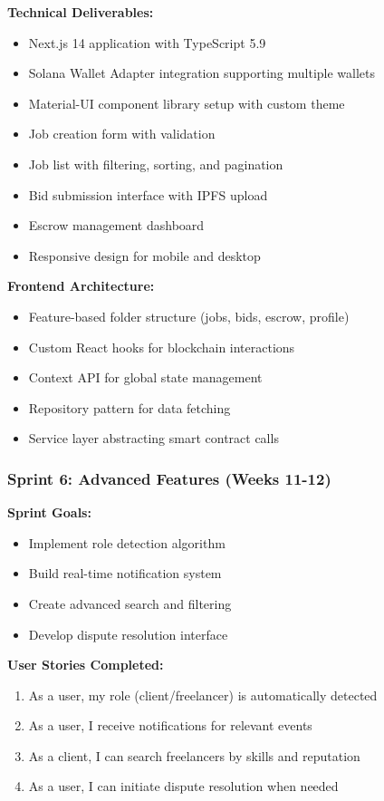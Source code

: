 \documentclass[a4paper,13pt,twoside]{report}
\theoremstyle{definition}
\begin{document}
\textbf{Technical Deliverables:}
\begin{itemize}
    \item Next.js 14 application with TypeScript 5.9
    \item Solana Wallet Adapter integration supporting multiple wallets
    \item Material-UI component library setup with custom theme
    \item Job creation form with validation
    \item Job list with filtering, sorting, and pagination
    \item Bid submission interface with IPFS upload
    \item Escrow management dashboard
    \item Responsive design for mobile and desktop
\end{itemize}

\textbf{Frontend Architecture:}
\begin{itemize}
    \item Feature-based folder structure (jobs, bids, escrow, profile)
    \item Custom React hooks for blockchain interactions
    \item Context API for global state management
    \item Repository pattern for data fetching
    \item Service layer abstracting smart contract calls
\end{itemize}

\subsubsection{Sprint 6: Advanced Features (Weeks 11-12)}

\textbf{Sprint Goals:}
\begin{itemize}
    \item Implement role detection algorithm
    \item Build real-time notification system
    \item Create advanced search and filtering
    \item Develop dispute resolution interface
\end{itemize}

\textbf{User Stories Completed:}
\begin{enumerate}
    \item As a user, my role (client/freelancer) is automatically detected
    \item As a user, I receive notifications for relevant events
    \item As a client, I can search freelancers by skills and reputation
    \item As a user, I can initiate dispute resolution when needed
\end{enumerate}
\end{document}
